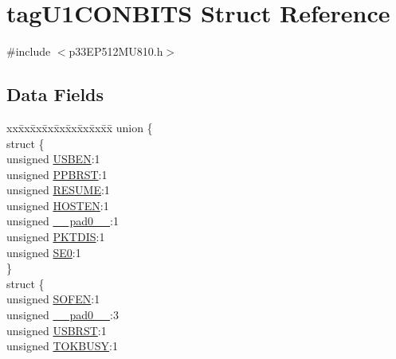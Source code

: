 \hypertarget{structtag_u1_c_o_n_b_i_t_s}{}\section{tag\+U1\+C\+O\+N\+B\+I\+TS Struct Reference}
\label{structtag_u1_c_o_n_b_i_t_s}


{\ttfamily \#include $<$p33\+E\+P512\+M\+U810.\+h$>$}

\subsection*{Data Fields}
\begin{DoxyCompactItemize}
\item 
\begin{tabbing}
xx\=xx\=xx\=xx\=xx\=xx\=xx\=xx\=xx\=\kill
union \{\\
\>struct \{\\
\>\>unsigned \hyperlink{structtag_u1_c_o_n_b_i_t_s_a2a83a373b9970027443f60aa8908b1b0}{USBEN}:1\\
\>\>unsigned \hyperlink{structtag_u1_c_o_n_b_i_t_s_a145d96eb96bf1bd9e698b98fde41fe4e}{PPBRST}:1\\
\>\>unsigned \hyperlink{structtag_u1_c_o_n_b_i_t_s_a47c4b5fb974e9657d96ea75079a1cb5c}{RESUME}:1\\
\>\>unsigned \hyperlink{structtag_u1_c_o_n_b_i_t_s_abc7c4f3b4f3d0b92422da7619065d398}{HOSTEN}:1\\
\>\>unsigned \hyperlink{structtag_u1_c_o_n_b_i_t_s_adf71f3d8410c1f1dbbc96680a92c49af}{\_\_pad0\_\_}:1\\
\>\>unsigned \hyperlink{structtag_u1_c_o_n_b_i_t_s_a46c76c792e80c76f176d256fa6779d21}{PKTDIS}:1\\
\>\>unsigned \hyperlink{structtag_u1_c_o_n_b_i_t_s_ac03eca1b6db9083b2b4e68ec2a723654}{SE0}:1\\
\>\} \\
\>struct \{\\
\>\>unsigned \hyperlink{structtag_u1_c_o_n_b_i_t_s_a0a668b3c1854413a70675fc5cde04713}{SOFEN}:1\\
\>\>unsigned \hyperlink{structtag_u1_c_o_n_b_i_t_s_adf71f3d8410c1f1dbbc96680a92c49af}{\_\_pad0\_\_}:3\\
\>\>unsigned \hyperlink{structtag_u1_c_o_n_b_i_t_s_a5c8c28a70892e8f1b63aaa1cafa2ea70}{USBRST}:1\\
\>\>unsigned \hyperlink{structtag_u1_c_o_n_b_i_t_s_a38891832e0cc07a936e6e127d4196faf}{TOKBUSY}:1\\

\end{tabbing}
\end{DoxyCompactItemize}
